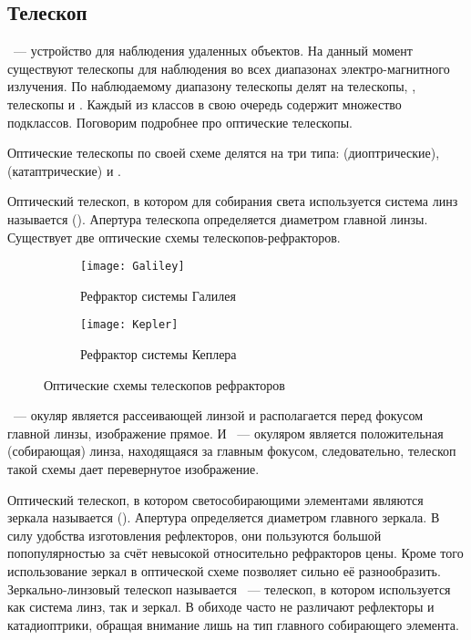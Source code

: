 \subsection{Телескоп}
~--- устройство для наблюдения удаленных объектов. На данный момент существуют телескопы  для наблюдения во всех  диапазонах электро-магнитного излучения. По наблюдаемому диапазону телескопы делят на  телескопы, ,  телескопы и . Каждый из классов в свою очередь содержит множество подклассов. Поговорим подробнее про оптические телескопы.

Оптические телескопы по своей схеме делятся на три типа:  (диоптрические),  (катаптрические) и .

Оптический телескоп, в котором для собирания света используется система линз называется  (). Апертура телескопа определяется диаметром главной линзы. Существует две оптические схемы телескопов-рефракторов. 

\vspace{-.3pc}
\begin{figure}[h!]
	\centering
	\begin{subfigure}{0.49\tw}
		\texttt{[image: Galiley]}
		\caption{Рефрактор системы Галилея}
	\end{subfigure}
	\hfill
	\begin{subfigure}{0.49\tw}
		\texttt{[image: Kepler]}
		\caption{Рефрактор системы Кеплера}
		\label{Kepler}
	\end{subfigure}
	\caption{Оптические схемы телескопов рефракторов}
\end{figure}

~--- окуляр является рассеивающей линзой и располагается перед фокусом главной линзы, изображение прямое. И ~--- окуляром является положительная (собирающая) линза, находящаяся за главным фокусом, следовательно, телескоп такой схемы дает перевернутое изображение.

Оптический телескоп,  в котором светособирающими элементами являются зеркала называется  (). Апертура определяется диаметром главного зеркала. В силу удобства изготовления рефлекторов, они пользуются большой попопулярностью за счёт невысокой относительно рефракторов цены. Кроме того использование зеркал в оптической схеме позволяет сильно её разнообразить. Зеркально-линзовый телескоп называется ~--- телескоп, в котором используется как система линз, так и зеркал. В обиходе часто не различают рефлекторы и катадиоптрики, обращая внимание лишь на тип главного собирающего элемента. 

